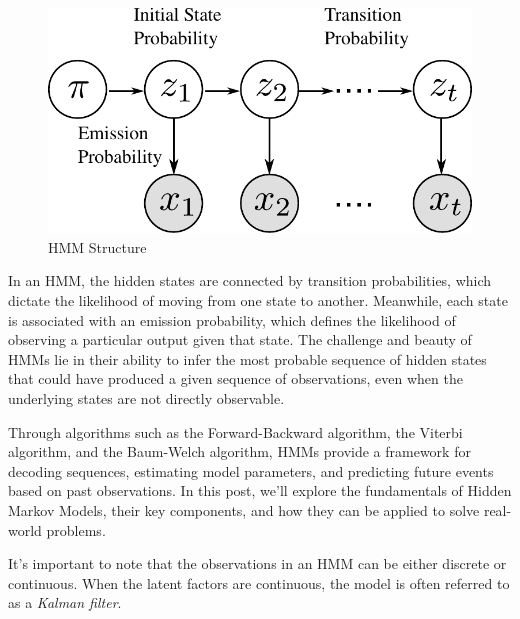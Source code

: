 \begin{figure}[h]
	\begin{center}
		\includegraphics[scale=0.5]{./images/hmm/hmm_figure.pdf}
	\end{center}
	\caption{HMM Structure}
	\label{fig:HMM}
\end{figure}

In an HMM, the hidden states are connected by transition probabilities, which dictate the likelihood of moving from one state to another. Meanwhile, each state is associated with an emission probability, which defines the likelihood of observing a particular output given that state. The challenge and beauty of HMMs lie in their ability to infer the most probable sequence of hidden states that could have produced a given sequence of observations, even when the underlying states are not directly observable.

Through algorithms such as the Forward-Backward algorithm, the Viterbi algorithm, and the Baum-Welch algorithm, HMMs provide a framework for decoding sequences, estimating model parameters, and predicting future events based on past observations. In this post, we'll explore the fundamentals of Hidden Markov Models, their key components, and how they can be applied to solve real-world problems.

It's important to note that the observations in an HMM can be either discrete or continuous. When the latent factors are continuous, the model is often referred to as a \textit{Kalman filter}.

